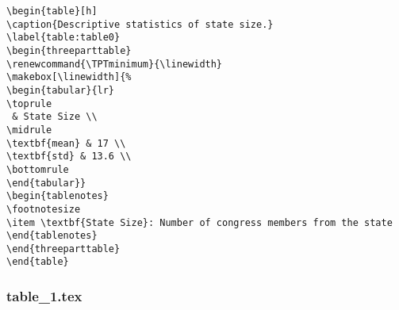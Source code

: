 \documentclass[11pt]{article}
\begin{document}
\begin{Verbatim}[tabsize=4]
\begin{table}[h]
\caption{Descriptive statistics of state size.}
\label{table:table0}
\begin{threeparttable}
\renewcommand{\TPTminimum}{\linewidth}
\makebox[\linewidth]{%
\begin{tabular}{lr}
\toprule
 & State Size \\
\midrule
\textbf{mean} & 17 \\
\textbf{std} & 13.6 \\
\bottomrule
\end{tabular}}
\begin{tablenotes}
\footnotesize
\item \textbf{State Size}: Number of congress members from the state
\end{tablenotes}
\end{threeparttable}
\end{table}

\end{Verbatim}

\subsubsection*{table\_1.tex}
\end{document}
